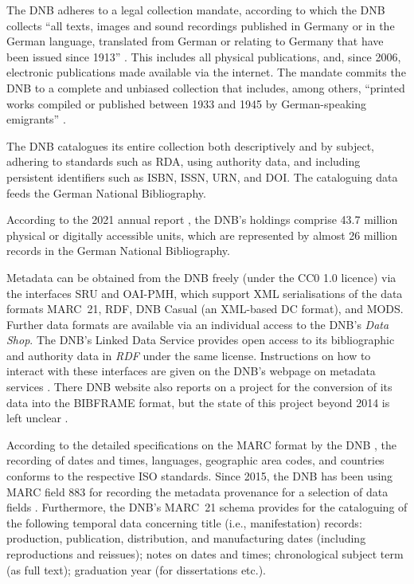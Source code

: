 The DNB adheres to a legal collection mandate, according to which
the DNB collects \enquote{all texts, images and sound recordings published in Germany or in the German language, translated from German or relating to Germany that have been issued since 1913}  \autocite{DNB_coll_mand}. This includes all physical publications, and, since 2006, electronic publications made available via the internet. The mandate commits the DNB to a complete and unbiased collection that includes, among others, \enquote{printed works compiled or published between 1933 and 1945 by German-speaking emigrants} \autocite{DNB_coll_mand}.

The DNB catalogues its entire collection both descriptively and by subject, 
adhering to standards such as \gls{RDA}, using authority data, and including persistent identifiers such as ISBN, ISSN, URN, and DOI.
The cataloguing data feeds the German National Bibliography.

According to the 2021 annual report \autocite{DNB_Jahresbericht_2021},
the DNB's holdings comprise 43.7 million physical or digitally accessible units, 
which are represented by almost 26 million records in the German National Bibliography.

Metadata can be obtained from the DNB freely (under the CC0 1.0 licence) via the interfaces
\gls{SRU} and \gls{OAI-PMH}, which support \gls{XML} serialisations of the data formats
\gls{MARC}~21, \gls{RDF}, DNB Casual (an \gls{XML}-based \gls{DC} format), and \gls{MODS}.
Further data formats are available via an individual access
to the DNB's \emph{Data Shop}.
The DNB's Linked Data Service provides open access to its bibliographic and authority data
in \emph{RDF} under the same license. Instructions on how to interact with these interfaces
are given on the DNB's webpage on metadata services \autocite{DNB_metadata}.
There DNB website also reports on a project for the conversion of its data
into the \gls{BIBFRAME} format, but the state of this project beyond 2014
is left unclear \autocite{DNBBIBFRAME}.


According to the detailed specifications on the \gls{MARC} format by the DNB
\autocite{DNB_MARC21,DNB_MARCXML}, the recording of dates and times, languages,
geographic area codes, and countries conforms to the respective \gls{ISO} standards.
Since 2015, the DNB has been using \gls{MARC} field 883
for recording the metadata provenance for a selection of data fields
\autocite{DNBwiki_MARC_883}.
Furthermore, the DNB's MARC~21 schema provides for the cataloguing of the following temporal data concerning
title (i.e., manifestation) records: production, publication, distribution, and manufacturing dates
(including reproductions and reissues); notes on dates and times;
chronological subject term (as full text); graduation year (for dissertations etc.).

